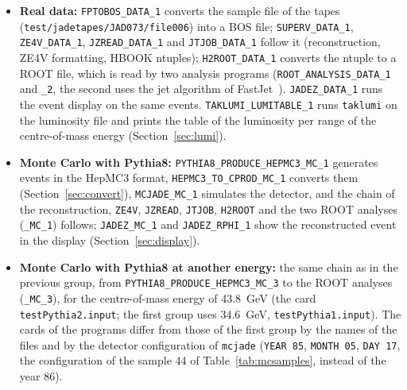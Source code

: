 \begin{itemize}
\item \textbf{Real data:} \texttt{FPTOBOS\_\allowbreak{}DATA\_\allowbreak{}1} converts the sample file of the tapes (\texttt{test/\allowbreak{}jadetapes/\allowbreak{}JAD073/\allowbreak{}file006}) into a BOS file;
\texttt{SUPERV\_\allowbreak{}DATA\_\allowbreak{}1}, \texttt{ZE4V\_\allowbreak{}DATA\_\allowbreak{}1}, \texttt{JZREAD\_\allowbreak{}DATA\_\allowbreak{}1} and \texttt{JTJOB\_\allowbreak{}DATA\_\allowbreak{}1} follow it (reconstruction, ZE4V formatting, HBOOK ntuples);
\texttt{H2ROOT\_\allowbreak{}DATA\_\allowbreak{}1} converts the ntuple to a ROOT file, which is read by two analysis programs (\texttt{ROOT\_\allowbreak{}ANALYSIS\_\allowbreak{}DATA\_\allowbreak{}1} and \texttt{\_2},
the second uses the jet algorithm of FastJet~\cite{Cacciari:2011ma}). \texttt{JADEZ\_\allowbreak{}DATA\_\allowbreak{}1} runs the event display on the same events. \texttt{TAKLUMI\_\allowbreak{}LUMITABLE\_\allowbreak{}1} runs \texttt{taklumi} on the luminosity file and prints the table of the luminosity per range of the centre-of-mass energy (Section~\ref{sec:lumi}).
\item \textbf{Monte Carlo with Pythia8:} \texttt{PYTHIA8\_\allowbreak{}PRODUCE\_\allowbreak{}HEPMC3\_\allowbreak{}MC\_\allowbreak{}1} generates events in the HepMC3 format,
\texttt{HEPMC3\_\allowbreak{}TO\_\allowbreak{}CPROD\_\allowbreak{}MC\_\allowbreak{}1} converts them (Section~\ref{sec:convert}), \texttt{MCJADE\_\allowbreak{}MC\_\allowbreak{}1} simulates the detector, and the chain of the
reconstruction, \texttt{ZE4V}, \texttt{JZREAD}, \texttt{JTJOB}, \texttt{H2ROOT} and the two ROOT analyses (\texttt{\_MC\_1}) follows;
\texttt{JADEZ\_\allowbreak{}MC\_\allowbreak{}1} and \texttt{JADEZ\_\allowbreak{}RPHI\_\allowbreak{}1} show the reconstructed event in the display (Section~\ref{sec:display}).
\item \textbf{Monte Carlo with Pythia8 at another energy:} the same chain as in the previous group, from \texttt{PYTHIA8\_\allowbreak{}PRODUCE\_\allowbreak{}HEPMC3\_\allowbreak{}MC\_\allowbreak{}3}
to the ROOT analyses (\texttt{\_MC\_3}), for the centre-of-mass energy of 43.8~GeV (the card \texttt{testPythia2.input}; the first group uses 34.6~GeV, \texttt{testPythia1.input}). The cards of the
programs differ from those of the first group by the names of the files and by the detector configuration of \texttt{mcjade} (\texttt{YEAR 85}, \texttt{MONTH 05}, \texttt{DAY 17}, the configuration of the sample 44 of Table~\ref{tab:mcsamples}, instead of the year 86).

\end{itemize}
